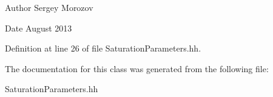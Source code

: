 \begin{DoxyAuthor}{Author}
Sergey Morozov 
\end{DoxyAuthor}
\begin{DoxyDate}{Date}
August 2013 
\end{DoxyDate}


Definition at line 26 of file SaturationParameters.hh.

The documentation for this class was generated from the following file:\begin{DoxyCompactItemize}
\item 
SaturationParameters.hh\end{DoxyCompactItemize}
